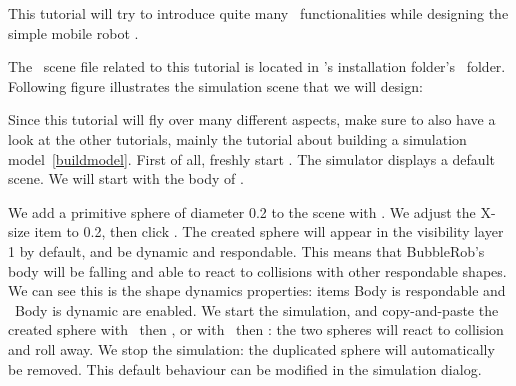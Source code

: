 \label{bublerob}


This tutorial will try to introduce quite many \vrep\ functionalities while 
designing the simple mobile robot . 

The \vrep\ scene file 
related to this tutorial is located in \vrep's installation folder's 
\ folder. Following figure illustrates the 
simulation scene that we will design:


Since this tutorial will fly over many different aspects, make sure to also 
have a look at the other tutorials, mainly the tutorial about building a 
simulation model\ \ref{buildmodel}. First of all, freshly start \vrep. 
The simulator displays 
a default scene. We will start with the body of .

We add a primitive sphere of diameter 0.2 to the scene with
. We adjust the X-size item to 0.2, 
then click . The created sphere will appear in the visibility layer 
1 by default, and be dynamic and respondable. This means that 
BubbleRob's body will be falling and able to react to collisions with other 
respondable shapes. We can see 
this is the shape dynamics properties: items Body is respondable and 
\checkbox\ Body is dynamic are enabled. We start the simulation, and 
copy-and-paste the created sphere with
\ then , or 
with \ then : the two spheres will react to 
collision and roll away. We stop the simulation: the duplicated sphere will 
automatically be removed. This default behaviour can be modified in the 
simulation dialog.














